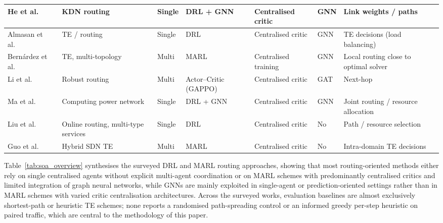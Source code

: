 \documentclass[10pt,journal,comsoc]{IEEEtran}
\begin{document}
\begin{table}[htbp]
\begin{tabular}{|p{2.2cm}|p{2.1cm}|p{1.4cm}|p{1.9cm}|p{1.9cm}|p{1.5cm}|p{2.1cm}|}
    \hline
    He et al.~\cite{he2023routing} & KDN routing & Single & DRL + GNN & Centralised critic & GNN & Link weights / paths \\
    \hline
    Almasan et al.~\cite{almasan2022deep} & TE / routing & Single & DRL & Centralised critic & GNN & TE decisions (load balancing) \\
    \hline
    Bern\'ardez et al.~\cite{bernardez2023magnneto} & TE, multi-topology & Multi & MARL & Centralised training & GNN & Local routing close to optimal solver \\
    \hline
    Li et al.~\cite{li2023gappo} & Robust routing & Multi & Actor--Critic (GAPPO) & Centralised critic & GAT & Next-hop \\
    \hline
    Ma et al.~\cite{ma2024routing} & Computing power network & Single & DRL + GNN & Centralised critic & GNN & Joint routing / resource allocation \\
    \hline
    Liu et al.~\cite{liu2023scalable} & Online routing, multi-type services & Single & DRL & Centralised critic & No & Path / resource selection \\
    \hline
    Guo et al.~\cite{guo2024distributed} & Hybrid SDN TE & Multi & MARL & Centralised critic & No & Intra-domain TE decisions \\
    \hline
  \end{tabular}
\end{table}

Table~\ref{tab:soa_overview} synthesises the surveyed DRL and MARL routing approaches, showing that most routing-oriented methods either rely on single centralised agents without explicit multi-agent coordination or on MARL schemes with predominantly centralised critics and limited integration of graph neural networks, while GNNs are mainly exploited in single-agent or prediction-oriented settings rather than in MARL schemes with varied critic centralisation architectures. Across the surveyed works, evaluation baselines are almost exclusively shortest-path or heuristic TE schemes; none reports a randomised path-spreading control or an informed greedy per-step heuristic on paired traffic, which are central to the methodology of this paper.
\end{document}
